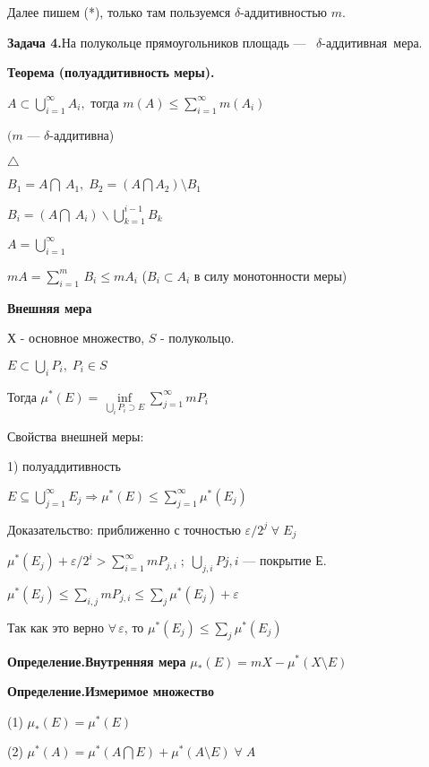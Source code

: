 Далее пишем (*), только там пользуемся $\delta$-аддитивностью $m$.

\textbf{Задача 4.}\quad На полукольце прямоугольников площадь ---~
$\delta$-аддитивная~мера.

\textbf{Теорема (полуаддитивность меры).}

$A \subset \bigcup_{i=1}^{\infty} A_i,$ тогда $m(A) \leqslant \sum
_{i=1}^{\infty} m(A_i)$

$(m$ --- $\delta$-аддитивна)


$\triangle$

$B_1 = A \bigcap\: A_1, \; B_2 = (A \bigcap A_2)\setminus B_1$

$B_i = (A \bigcap\: A_i)\backslash \bigcup_{k=1}^{i-1} B_k$

$A = \bigcup_{i=1}^{\infty}$

$ mA = \sum_{i=1}^m\,B_i \leqslant mA_i$ ($B_i \subset A_i$ в силу
монотонности меры)

\begin{center}
\textbf{Внешняя мера}
\end{center}

Х - основное множество, $S$ - полукольцо.

$E \subset \bigcup_i P_i, \; P_i \in S$

Тогда $\mu ^* (E) = \inf\limits_{\bigcup\limits_i P_i \supset E}
\sum_{j=1}^{\infty}mP_i$

Свойства внешней меры:

1) полуаддитивность

$E \subseteq \bigcup_{j=1}^{\infty} E_j \Rightarrow \mu ^* (E)
\leqslant \sum_{j=1}^{\infty} \mu ^* (E_j)$

Доказательство: приближенно с точностью $\varepsilon / 2^j \;
\forall\; E_j$

$\mu ^* (E_j) + \varepsilon / 2^i > \sum_{i=1}^{\infty}mP_{j,i}\;;
 \; \bigcup_{j,i} P{j,i}$ --- покрытие $Е$.

$\mu ^* (E_j) \leqslant \sum_{i,j}mP_{j,i} \leqslant \sum_j \mu ^*
(E_j) + \varepsilon$

Так как это верно $\forall\,\varepsilon$, то $\mu ^* (E_j)
\leqslant \sum_j \mu ^* (E_j)$

\textbf{Определение.}\quad \textbf{Внутренняя мера} \quad $\mu _*
(E) = mX - \mu ^* (X \setminus E)$

\textbf{Определение.}\quad \textbf{Измеримое множество}

(1) $\mu _* (E) = \mu ^* (E)$

(2) $\mu ^* (A) = \mu ^* (A \bigcap E) + \mu ^* (A \setminus E) \;
\forall \; A$
